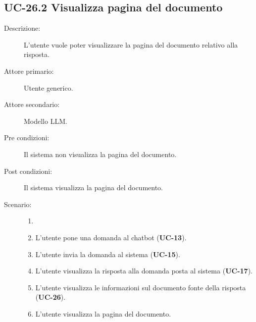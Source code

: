 \subsection{UC-26.2 Visualizza pagina del documento}
\begin{description}
    \item[Descrizione:] L'utente vuole poter visualizzare la pagina del documento relativo alla risposta.
    \item[Attore primario:] Utente generico.
    \item[Attore secondario:] Modello LLM.
    \item[Pre condizioni:] Il sistema non visualizza la pagina del documento.
    \item[Post condizioni:] Il sistema visualizza la pagina del documento.
    \item[Scenario:] 
    \begin{enumerate}
        \item[]
        \item L’utente pone una domanda al chatbot (\textbf{UC-13}).
        \item L'utente invia la domanda al sistema (\textbf{UC-15}).
        \item L'utente visualizza la risposta alla domanda posta al sistema (\textbf{UC-17}).
        \item L'utente visualizza le informazioni sul documento fonte della risposta (\textbf{UC-26}).
        \item L'utente visualizza la pagina del documento.
    \end{enumerate}
\end{description}

